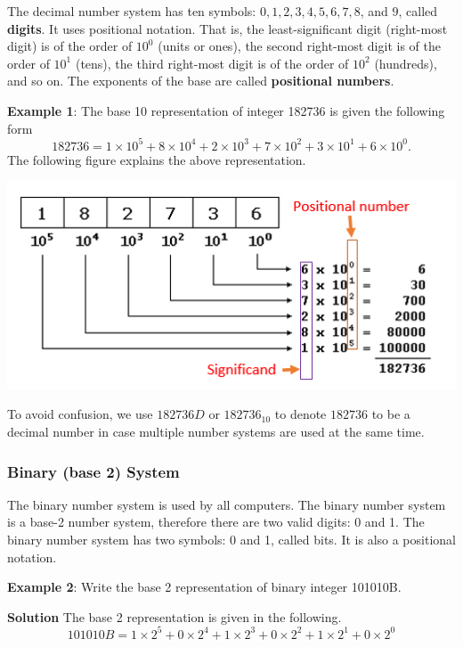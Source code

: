 \documentclass[
]{book}
\begin{document}
The decimal number system has ten symbols: \(0, 1, 2, 3, 4, 5, 6, 7, 8\), and \(9\), called \textbf{digits}. It uses positional notation. That is, the least-significant digit (right-most digit) is of the order of \(10^0\) (units or ones), the second right-most digit is of the order of \(10^1\) (tens), the third right-most digit is of the order of \(10^2\) (hundreds), and so on. The exponents of the base are called \textbf{positional numbers}.

\hfill\break

\textbf{Example 1}: The base 10 representation of integer 182736 is given the following form \[
182736 = 1\times 10^5 + 8\times 10^4 + 2\times 10^3 + 7\times 10^2 + 3\times 10^1 + 6\times 10^0.
\] The following figure explains the above representation.

\begin{center}\includegraphics[width=0.85\linewidth]{img02/w02-base10Rep} \end{center}

To avoid confusion, we use \(182736D\) or \(182736_{10}\) to denote \(182736\) to be a decimal number in case multiple number systems are used at the same time.

\hfill\break

\hypertarget{binary-base-2-system}{%
\subsubsection{Binary (base 2) System}\label{binary-base-2-system}}

The binary number system is used by all computers. The binary number system is a base-2 number system, therefore there are two valid digits: 0 and 1. The binary number system has two symbols: 0 and 1, called bits. It is also a positional notation.

\textbf{Example 2}: Write the base 2 representation of binary integer 101010B.

\textbf{Solution} The base 2 representation is given in the following. \[
101010B = 1\times 2^5 + 0\times 2^4 + 1\times 2^3 + 0\times 2^2 + 1\times 2^1 + 0\times 2^0
\]
\end{document}
